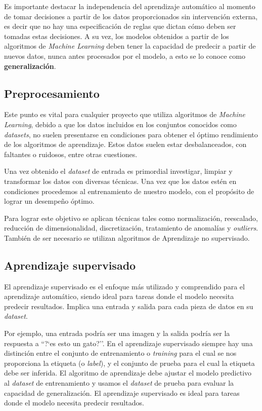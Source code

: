 \documentclass[a4paper,12pt]{article}
\begin{document}
Es importante destacar la independencia del aprendizaje automático al momento de tomar decisiones a partir de los datos proporcionados sin intervención externa, es decir que no hay una especificación de reglas que dictan cómo deben ser tomadas estas decisiones. A su vez, los modelos obtenidos a partir de los algoritmos de \textit{Machine Learning} deben tener la capacidad de predecir a partir de nuevos datos, nunca antes procesados por el modelo, a esto se lo conoce como \textbf{generalización}. 

\subsection{Preprocesamiento} \label{preprocessing}
Este punto es vital para cualquier proyecto que utiliza algoritmos de \textit{Machine Learning}, debido a que los datos incluidos en los conjuntos conocidos como \textit{datasets}, no suelen presentarse en condiciones para obtener el óptimo rendimiento de los algoritmos de aprendizaje. Estos datos suelen estar desbalanceados, con faltantes o ruidosos, entre otras cuestiones. 

Una vez obtenido el \textit{dataset} de entrada es primordial investigar, limpiar y transformar los datos con diversas técnicas. Una vez que los datos estén en condiciones procedemos al entrenamiento de nuestro modelo, con el propósito de lograr un desempeño óptimo.

Para lograr este objetivo se aplican técnicas tales como normalización, reescalado, reducción de dimensionalidad, discretización, tratamiento de anomalías y \textit{outliers}. También de ser necesario se utilizan algoritmos de Aprendizaje no supervisado.

\subsection{Aprendizaje supervisado} \label{supervised}
El aprendizaje supervisado es el enfoque más utilizado y comprendido para el aprendizaje automático, siendo ideal para tareas donde el modelo necesita predecir resultados. Implica una entrada y salida para cada pieza de datos en su \textit{dataset}. 

Por ejemplo, una entrada podría ser una imagen y la salida podría ser la respuesta a ``?`es esto un gato?''. En el aprendizaje supervisado siempre hay una distinción entre el conjunto de entrenamiento o \textit{training} para el cual se nos proporciona la etiqueta (o \textit{label}), y el conjunto de prueba para el cual la etiqueta debe ser inferida. El algoritmo de aprendizaje debe ajustar el modelo predictivo al \textit{dataset} de entrenamiento y usamos el \textit{dataset} de prueba para evaluar la capacidad de generalización. El aprendizaje supervisado es ideal para tareas donde el modelo necesita predecir resultados.
\end{document}
